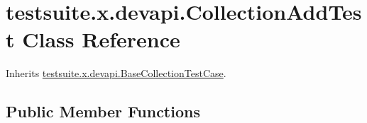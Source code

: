 \hypertarget{classtestsuite_1_1x_1_1devapi_1_1_collection_add_test}{}\section{testsuite.\+x.\+devapi.\+Collection\+Add\+Test Class Reference}
\label{classtestsuite_1_1x_1_1devapi_1_1_collection_add_test}


Inherits \mbox{\hyperlink{classtestsuite_1_1x_1_1devapi_1_1_base_collection_test_case}{testsuite.\+x.\+devapi.\+Base\+Collection\+Test\+Case}}.

\subsection*{Public Member Functions}

